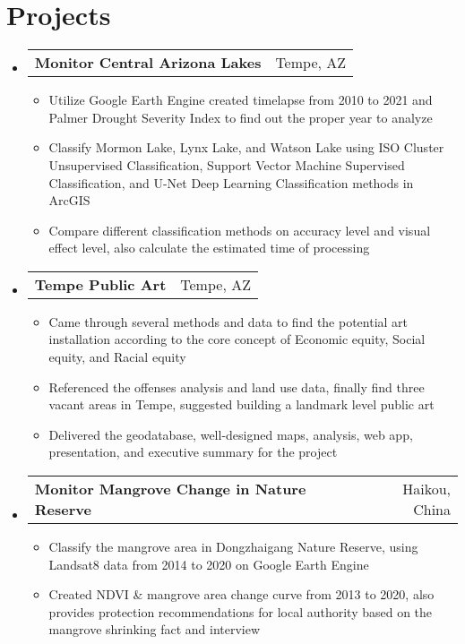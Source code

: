 \documentclass[letterpaper,11pt]{article}
\makeatletter
\newcommand{\resumeSubSubheading}[4]{
  \vspace{-1pt}\item
    \begin{tabular*}{0.97\textwidth}[t]{l@{\extracolsep{\fill}}r}
      \textbf{#1} & #2 \\
    \end{tabular*}\vspace{-5pt}
}
\newcommand{\resumeItemPro}[2]{\item\small{ #2 \vspace{-2pt}}}
\newcommand{\resumeSubHeadingListStart}{\begin{itemize}[leftmargin=*]}
\newcommand{\resumeSubHeadingListEnd}{\end{itemize}}
\newcommand{\resumeItemListStart}{\begin{itemize}}
\newcommand{\resumeItemListEnd}{\end{itemize}\vspace{-5pt}}
\makeatother
\begin{document}
\section{Projects}
  \resumeSubHeadingListStart
    \resumeSubSubheading
      {Monitor Central Arizona Lakes}{Tempe, AZ}
      {Capstone Project}{April 2022 - July 2022}
      \resumeItemListStart
        \resumeItemPro{}{Utilize Google Earth Engine created timelapse from 2010 to 2021 and Palmer Drought Severity Index to find out the proper year to analyze}
        \resumeItemPro{}{Classify Mormon Lake, Lynx Lake, and Watson Lake using ISO Cluster Unsupervised Classification, Support Vector Machine Supervised Classification, and U-Net Deep Learning Classification methods in ArcGIS}
        \resumeItemPro{}{Compare different classification methods on accuracy level and visual effect level, also calculate the estimated time of processing}
        \resumeItemListEnd
    \resumeSubSubheading
      {Tempe Public Art}{Tempe, AZ}
      {Course Project}{Oct 2021 - Dec 2021}
      \resumeItemListStart
        \resumeItemPro{}{Came through several methods and data to find the potential art installation according to the core concept of Economic equity, Social equity, and Racial equity}
        \resumeItemPro{}{Referenced the offenses analysis and land use data, finally find three vacant areas in Tempe, suggested building a landmark level public art}
        \resumeItemPro{}{Delivered the geodatabase, well-designed maps, analysis, web app, presentation, and executive summary for the project}
      \resumeItemListEnd
    \resumeSubSubheading
      {Monitor Mangrove Change in Nature Reserve}{Haikou, China}
      {Graduation Project}{Oct 2020 - May 2021}
      \resumeItemListStart
        \resumeItemPro{}{Classify the mangrove area in Dongzhaigang Nature Reserve, using Landsat8 data from 2014 to 2020 on Google Earth Engine}
        \resumeItemPro{}{Created NDVI \& mangrove area change curve from 2013 to 2020, also provides protection recommendations for local authority based on the mangrove shrinking fact and interview}
        
      \resumeItemListEnd
    



  \resumeSubHeadingListEnd

%


\end{document}
